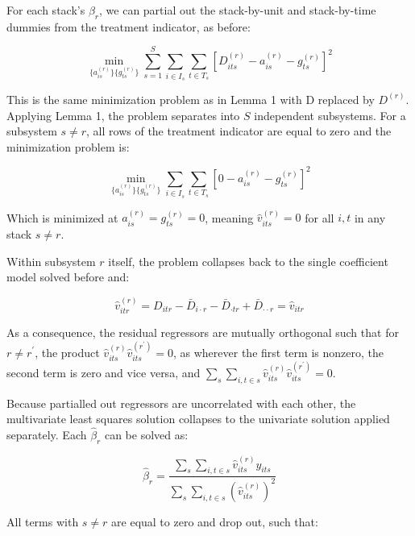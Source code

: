 \documentclass[12pt]{article}
\begin{document}
For each stack's $\beta_r$, we can partial out the stack-by-unit and stack-by-time dummies from the treatment indicator, as before:

\begin{equation*}
    \min_{\{a^{(r)}_{is}\}\{g^{(r)}_{ts}\}} \sum_{s=1}^S \sum_{i \in I_s} \sum_{t \in  T_s}[D^{(r)}_{its} - a^{(r)}_{is} - g^{(r)}_{ts}]^2
\end{equation*}

This is the same minimization problem as in Lemma 1 with D replaced by $D^{(r)}$. Applying Lemma 1, the problem separates into $S$ independent subsystems. For a subsystem $s \neq r$, all rows of the treatment indicator are equal to zero and the minimization problem is:

\begin{equation*}
    \min_{\{a^{(r)}_{is}\}\{g^{(r)}_{ts}\}} \sum_{i \in I_s} \sum_{t \in  T_s}[0 - a^{(r)}_{is} - g^{(r)}_{ts}]^2
\end{equation*}

Which is minimized at $a^{(r)}_{is} = g^{(r)}_{ts} = 0$, meaning $\hat{v}^{(r)}_{its} = 0$ for all $i,t$ in any stack $s \neq r$.

Within subsystem $r$ itself, the problem collapses back to the single coefficient model solved before and:

\begin{equation*}
    \hat{v}^{(r)}_{itr} = D_{itr} - \bar{D}_{i \cdot r} - \bar{D}_{\cdot t r} + \bar{D}_{\cdot \cdot r} = \hat{v}_{itr}
\end{equation*}

As a consequence, the residual regressors are mutually orthogonal such that for $r \neq r^\prime$, the product $\hat{v}^{(r)}_{its}\hat{v}^{(r^\prime)}_{its} = 0$, as wherever the first term is nonzero, the second term is zero and vice versa, and $\sum_s \sum_{i,t\in s} \hat{v}^{(r)}_{its}\hat{v}^{(r^\prime)}_{its} = 0$.

Because partialled out regressors are uncorrelated with each other, the multivariate least squares solution collapses to the univariate solution applied separately. Each $\hat{\beta}_r$ can be solved as:

\begin{equation*}
    \hat{\beta}_r = \frac{\sum_s \sum_{i,t\in s} \hat{v}^{(r)}_{its} y_{its}}{\sum_s \sum_{i,t\in s} (\hat{v}^{(r)}_{its})^2}
\end{equation*}

All terms with $s \neq r$ are equal to zero and drop out, such that:
\end{document}
